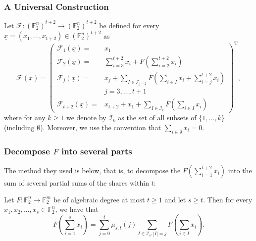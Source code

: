 \documentclass[
    aspectratio=169,                   %
]{beamer}
\newcommand{\F}{\mathbb{F}}
\begin{document}
    \begin{frame}
        \frametitle{A Universal Construction}
    
        Let $\mathcal{F}:\left(\mathbb{F}_2^n\right)^{t+2} \rightarrow\left(\mathbb{F}_2^n\right)^{t+2}$ be defined for every $\underline{x}=\left(x_1, \ldots, x_{t+2}\right) \in\left(\mathbb{F}_2^n\right)^{t+2}$ as
        \[
        \mathcal{F}(\underline{x})=\left(\begin{array}{rl}
        \mathcal{F}_1(\underline{x})= & x_1 \\
        \mathcal{F}_2(\underline{x})= & \sum_{i=3}^{t+2} x_i+F\left(\sum_{i=2}^{t+2} x_i\right) \\
        \mathcal{F}_j(\underline{x})= & x_j+\sum_{I \in \mathcal{I}_{j-2}} F\left(\sum_{i \in I} x_i+\sum_{i=j}^{t+2} x_i\right) \\
        & j=3, \ldots, t+1 \\
        \mathcal{F}_{t+2}(\underline{x})= & x_{t+2}+x_1+\sum_{I \in \mathcal{I}_t} F\left(\sum_{i \in I} x_i\right)
        \end{array}\right)^{\mathrm{T}},
        \]
        where for any $k \geq 1$ we denote by $\mathcal{I}_k$ as the set of all subsets of $\{1, \ldots, k\}$ (including $\emptyset$). Moreover, we use the convention that $\sum_{i \in \emptyset} x_i=0$.
    
    \end{frame}

    \begin{frame}
        \frametitle{Decompose $ F $ into several parts}
    
     The method they used is below, that is, to decompose the 
    $ F(\sum_{i=1}^{t+2}x_i) $ into the sum of several partial sums of the shares within $ t $:
    \begin{lemma}
      Let $ F:\F_2^n\rightarrow\F_2^m $ be of algebraic degree at most $ t\ge 1 $ and let $ s\ge t $. Then for every 
      $ x_1,x_2,...,x_s\in\F_2^n  $, we have that 
      \[F\left( \sum_{i=1}^{s}x_i \right)=\sum_{j=0}^{t}\mu_{s,t}(j)\sum_{I\in\mathcal{I}_s,|I|=j}F\left( \sum_{i\in I}x_i \right).\]
    \end{lemma} 

\end{frame}
\end{document}
